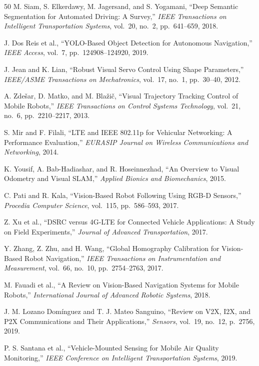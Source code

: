 \begin{thebibliography}{50}
M. Siam, S. Elkerdawy, M. Jagersand, and S. Yogamani,
``Deep Semantic Segmentation for Automated Driving: A Survey,''
\textit{IEEE Transactions on Intelligent Transportation Systems},
vol.~20, no.~2, pp.~641--659, 2018.

J. Dos Reis et al.,
``YOLO-Based Object Detection for Autonomous Navigation,''
\textit{IEEE Access},
vol.~7, pp.~124908--124920, 2019.

J. Jean and K. Lian,
``Robust Visual Servo Control Using Shape Parameters,''
\textit{IEEE/ASME Transactions on Mechatronics},
vol.~17, no.~1, pp.~30--40, 2012.

A. Zde\v{s}ar, D. Matko, and M. Bla\v{z}i\v{c},
``Visual Trajectory Tracking Control of Mobile Robots,''
\textit{IEEE Transactions on Control Systems Technology},
vol.~21, no.~6, pp.~2210--2217, 2013.

S. Mir and F. Filali,
``LTE and IEEE 802.11p for Vehicular Networking: A Performance Evaluation,''
\textit{EURASIP Journal on Wireless Communications and Networking},
2014.

K. Yousif, A. Bab-Hadiashar, and R. Hoseinnezhad,
``An Overview to Visual Odometry and Visual SLAM,''
\textit{Applied Bionics and Biomechanics},
2015.

C. Pati and R. Kala,
``Vision-Based Robot Following Using RGB-D Sensors,''
\textit{Procedia Computer Science},
vol.~115, pp.~586--593, 2017.

Z. Xu et al.,
``DSRC versus 4G-LTE for Connected Vehicle Applications: A Study on Field Experiments,''
\textit{Journal of Advanced Transportation},
2017.

Y. Zhang, Z. Zhu, and H. Wang,
``Global Homography Calibration for Vision-Based Robot Navigation,''
\textit{IEEE Transactions on Instrumentation and Measurement},
vol.~66, no.~10, pp.~2754--2763, 2017.

M. Fauadi et al.,
``A Review on Vision-Based Navigation Systems for Mobile Robots,''
\textit{International Journal of Advanced Robotic Systems},
2018.

J. M. Lozano Dom\'{i}nguez and T. J. Mateo Sanguino,
``Review on V2X, I2X, and P2X Communications and Their Applications,''
\textit{Sensors},
vol.~19, no.~12, p.~2756, 2019.

P. S. Santana et al.,
``Vehicle-Mounted Sensing for Mobile Air Quality Monitoring,''
\textit{IEEE Conference on Intelligent Transportation Systems},
2019.


\end{thebibliography}
